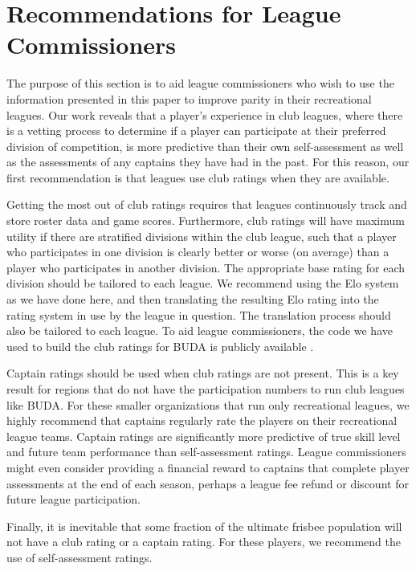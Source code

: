 \section{Recommendations for League Commissioners}\label{sec:recommendations}

The purpose of this section is to aid league commissioners who wish to use the information presented in this paper to improve parity in their recreational leagues. Our work reveals that a player's experience in club leagues, where there is a vetting process to determine if a player can participate at their preferred division of competition, is more predictive than their own self-assessment as well as the assessments of any captains they have had in the past. For this reason, our first recommendation is that leagues use club ratings when they are available. 

Getting the most out of club ratings requires that leagues continuously track and store roster data and game scores. Furthermore, club ratings will have maximum utility if there are stratified divisions within the club league, such that a player who participates in one division is clearly better or worse (on average) than a player who participates in another division. The appropriate base rating for each division should be tailored to each league. We recommend using the Elo system as we have done here, and then translating the resulting Elo rating into the rating system in use by the league in question. The translation process should also be tailored to each league. To aid league commissioners, the code we have used to build the club ratings for BUDA is publicly available \cite{shanegit}.

Captain ratings should be used when club ratings are not present. This is a key result for regions that do not have the participation numbers to run club leagues like BUDA. For these smaller organizations that run only recreational leagues, we highly recommend that captains regularly rate the players on their recreational league teams. Captain ratings are significantly more predictive of true skill level and future team performance than self-assessment ratings. League commissioners might even consider providing a financial reward to captains that complete player assessments at the end of each season, perhaps a league fee refund or discount for future league participation. 

Finally, it is inevitable that some fraction of the ultimate frisbee population will not have a club rating or a captain rating. For these players, we recommend the use of self-assessment ratings.
